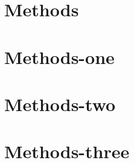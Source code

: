 \documentclass[../main.tex]{subfiles}
\begin{document}
\section{Methods}


\section*{Methods-one}

\blindtext


\section*{Methods-two}

\blindtext


\section*{Methods-three}

\blindtext
\end{document}

